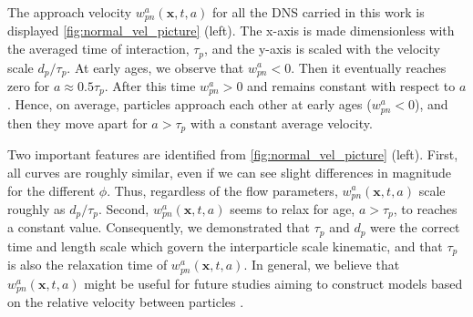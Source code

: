 The approach velocity $w_{pn}^a(\textbf{x},t,a)$ for all the DNS carried in this work is displayed \ref{fig:normal_vel_picture} (left). 
The x-axis is made dimensionless with the averaged time of interaction, $\tau_p$, and the y-axis is scaled with the velocity scale $d_p /\tau_p$. 
At early ages, we observe that $w_{pn}^a<0$.
Then it eventually reaches zero for  $a \approx 0.5\tau_p$.
After this time $w_{pn}^a>0$ and remains constant with respect to $a$. 
Hence, on average, particles approach each other at early ages ($w_{pn}^a<0$), and then they move apart for $a > \tau_p$ with a constant average velocity.

Two important features are identified from \ref{fig:normal_vel_picture} (left).
First, all curves are roughly similar, even if we can see slight differences in magnitude for the different $\phi$. 
Thus, regardless of the flow parameters, $w_{pn}^a(\textbf{x},t,a)$ scale roughly as $d_p /\tau_p$. 
Second,  $w_{pn}^a(\textbf{x},t,a)$ seems to relax for age, $a > \tau_p$, to reaches a constant value. 
Consequently, we demonstrated that $\tau_p$ and $d_p$ were the correct time and length scale which govern the interparticle scale kinematic, and that $\tau_p$ is also the relaxation time of $w_{pn}^a(\textbf{x},t,a)$. 
In general, we believe that $w_{pn}^a(\textbf{x},t,a)$ might be useful for future studies aiming to construct models based on the relative velocity between particles \citep{rao2008introduction}. 



